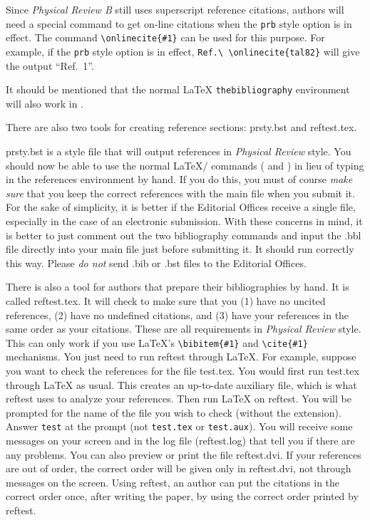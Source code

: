 \smallskip


Since {\em Physical Review B\/} still uses superscript reference citations,
authors will need a special command to get on-line citations when the
\verb+prb+ style option is in effect. The command \verb+\onlinecite{#1}+
can be used for this purpose. For example, if the \verb+prb+ style option
is in effect, \verb+Ref.\ \onlinecite{tal82}+ will give the output ``Ref.\
1''.


It should be mentioned that the normal \LaTeX{} \verb+thebibliography+
environment will also work in \REVTeX{}.

\bigskip


There are also two tools for creating reference sections: prsty.bst and
reftest.tex.

prsty.bst is a \BibTeX{} style file that will output references in {\em
Physical Review\/} style. You should now be able to use the normal
\LaTeX/\BibTeX{} commands (\verb++ and
\verb++) in lieu of typing in the references environment
by hand.  If you do this, you must of course {\em make sure\/} that you
keep the correct references with the main file when you submit it. For the
sake of simplicity, it is better if the Editorial Offices receive a single
file, especially in the case of an electronic submission. With these
concerns in mind, it is better to just comment out the two bibliography
commands and input the .bbl file directly into your main file just before
submitting it. It should run correctly this way. Please {\em do not\/} send
 .bib or .bst files to the Editorial Offices.


There is also a tool for authors that prepare their bibliographies by hand.
It is called reftest.tex. It will check to make sure that you (1) have no
uncited references, (2) have no undefined citations, and (3) have your
references in the same order as your citations. These are all requirements
in {\it Physical Review\/} style. This can only work if you use \LaTeX{}'s
\verb+\bibitem{#1}+ and \verb+\cite{#1}+ mechanisms. You just need to run
reftest through \LaTeX{}. For example, suppose you want to check the
references for the file test.tex. You would first run test.tex through
\LaTeX{} as usual. This creates an up-to-date auxiliary file, which is what
reftest uses to analyze your references. Then run \LaTeX{} on reftest. You
will be prompted for the name of the file you wish to check (without the
extension). Answer \verb+test+ at the prompt (not \verb+test.tex+ or
\verb+test.aux+). You will receive some messages on your screen and in the
log file (reftest.log) that tell you if there are any problems. You can
also preview or print the file reftest.dvi. If your references are out of
order, the correct order will be given only in reftest.dvi, not through
messages on the screen. Using reftest, an author can put the citations in
the correct order once, after writing the paper, by using the correct order
printed by reftest.



